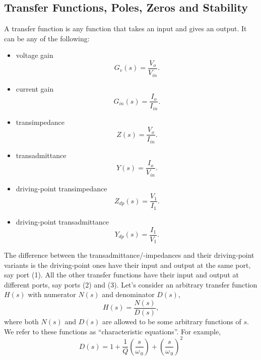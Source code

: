 \subsection{Transfer Functions, Poles, Zeros and Stability}
A transfer function is any function that takes an input and gives an output. It can be any of the following:
\begin{itemize}
\item voltage gain
 \begin{equation}
\label{eq:14}
G_{v}(s) = \frac{V_{o}}{V_{in}}.
\end{equation}
\item current gain
  \begin{equation}
\label{eq:15}
G_{in}(s) = \frac{I_{o}}{I_{in}}.
\end{equation}
\item transimpedance
    \begin{equation}
  \label{eq:16}
Z(s) = \frac{V_{o}}{I_{in}}.
\end{equation}
\item transadmittance
  \begin{equation}
  \label{eq:17}
Y(s) = \frac{I_{o}}{V_{in}}.
\end{equation}
\item driving-point transimpedance
  \begin{equation}
  \label{eq:18}
Z_{dp}(s) = \frac{V_{1}}{I_{1}}.
\end{equation}  
 \item driving-point transadmittance
  \begin{equation}
  \label{eq:19}
Y_{dp}(s) = \frac{I_{1}}{V_{1}}.
\end{equation}  
\end{itemize}
The difference between the transadmittance/-impedances and their driving-point variants is the driving-point ones have their input and output at the same port, say port (1). All the other transfer functions have their input and output at different ports, say ports (2) and (3).
Let's consider an arbitrary transfer function $H(s)$ with numerator $N(s)$ and denominator $D(s)$,
\begin{equation}
\label{eq:20}
H(s) = \frac{N(s)}{D(s)},
\end{equation}
where both $N(s)$ and $D(s)$ are allowed to be some arbitrary functions of $s$. We refer to these functions as ``characteristic equations''. For example,
\begin{equation}
\label{eq:21}
D(s) = 1 + \frac{1}{Q} \left( \frac{s}{\omega_{\,0}} \right) + \left( \frac{s}{\omega_{\,0}} \right)^{2}
\end{equation}
